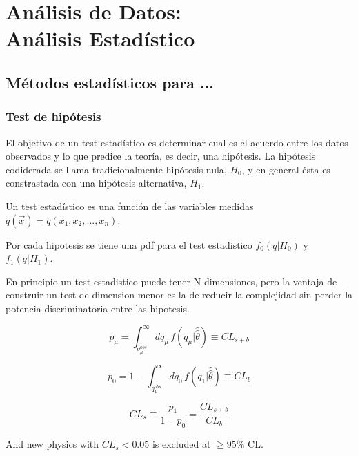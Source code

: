 \chapter[An\'alisis de Datos: An\'alisis Estad\'istico]{An\'alisis de Datos:\\[0.5cm] An\'alisis Estad\'istico}

\def\qmu{\ensuremath{q_\mu}}
\def\pdf{p.d.f.}

\section{M\'etodos estad\'isticos para ... } %

\subsection{Test de hip\'otesis}

El objetivo de un test estad\'istico es determinar cual es el acuerdo entre los datos observados y
lo que predice la teor\'ia, es decir, una hip\'otesis.
La hip\'otesis codiderada se llama tradicionalmente hip\'otesis nula, $H_0$, y en general \'esta
es constrastada con una hip\'otesis alternativa, $H_1$.

Un test estad\'istico es una funci\'on  de las variables medidas $q(\vec{x}) = q(x_1, x_2, ..., x_n)$.

Por cada hipotesis se tiene una pdf para el test estadistico $f_0(q|H_0)$ y $f_1(q|H_1)$.

En principio un test estadistico puede tener N dimensiones, pero la ventaja de construir un test de dimension menor es la de reducir la complejidad sin perder
la potencia discriminatoria entre las hipotesis.

\begin{equation}
   p_\mu = \int_{q^{obs}_\mu}^{\infty} dq_\mu \, f(q_\mu | \hat{\hat{\theta}}) \equiv CL_{s+b}
\end{equation}

\begin{equation}
  p_0 = 1 - \int_{q^{obs}_1}^{\infty} dq_0 \, f(q_1 | \hat{\hat{\theta}}) \equiv CL_{b}
\end{equation}


\begin{equation}
  CL_{s} \equiv \frac{p_1}{1-p_0} = \frac{CL_{s+b}}{CL_b}
\end{equation}


And new physics with $CL_s < 0.05$ is excluded at $\geq 95 \%$ CL.


